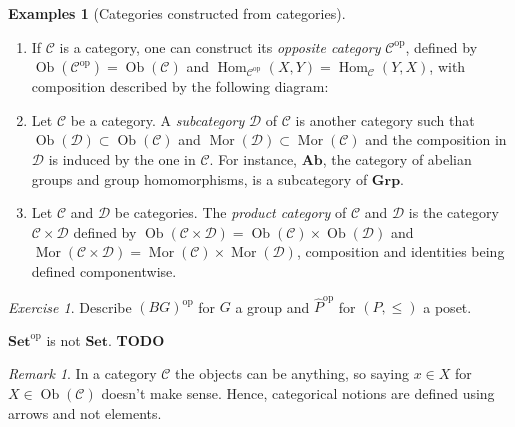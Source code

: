 \documentclass{article}
\newcommand{\op}{\mathrm{op}}
\newcommand{\cat}{\mathcal{C}}
\newcommand{\catt}{\mathcal{D}}
\newcommand{\Set}{\mathbf{Set}}
\newcommand{\Grp}{\mathbf{Grp}}
\newcommand{\Ab}{\mathbf{Ab}}
\DeclareMathOperator{\Ob}{Ob}
\DeclareMathOperator{\Mor}{Mor}
\DeclareMathOperator{\Hom}{Hom}
\newcommand{\todo}{\textbf{TODO}}
\newcommand{\warning}{\faExclamationTriangle \hspace{3pt}}
\theoremstyle{plain}
\theoremstyle{definition}
\newtheorem{examples}[theorem]{Examples}
\theoremstyle{remark}
\newtheorem*{remark}{Remark}
\newtheorem*{exercise}{Exercise}
\begin{document}
\begin{examples}[Categories constructed from categories] \leavevmode
    \begin{enumerate}
        \item If $\cat$ is a category, one can construct its \emph{opposite category} $\cat^\op$, defined by $\Ob(\cat^\op) = \Ob(\cat)$ and $\Hom_{\cat^\op}(X,Y) = \Hom_\cat(Y,X)$, with composition described by the following diagram:
        \begin{center}
        \end{center}
        \item Let $\cat$ be a category. A \emph{subcategory} $\catt$ of $\cat$ is another category such that $\Ob(\catt) \subset \Ob(\cat)$ and $\Mor(\catt) \subset \Mor(\cat)$ and the composition in $\catt$ is induced by the one in $\cat$. For instance, $\Ab$, the category of abelian groups and group homomorphisms, is a subcategory of $\Grp$.
        \item Let $\cat$ and $\catt$ be categories. The \emph{product category} of $\cat$ and $\catt$ is the category $\cat \times \catt$ defined by $\Ob(\cat \times \catt) = \Ob(\cat) \times \Ob(\catt)$ and $\Mor(\cat \times \catt) = \Mor(\cat) \times \Mor(\catt)$, composition and identities being defined componentwise.
    \end{enumerate}
\end{examples}

\begin{exercise}
    Describe $(BG)^\op$ for $G$ a group and $\hat{P}^\op$ for $(P,\le)$ a poset.
\end{exercise}

\warning $\Set^\op$ is not $\Set$. \todo

\begin{remark}
    In a category $\cat$ the objects can be anything, so saying $x \in X$ for $X \in \Ob(\cat)$ doesn't make sense. Hence, categorical notions are defined using arrows and not elements.
\end{remark}
\end{document}

